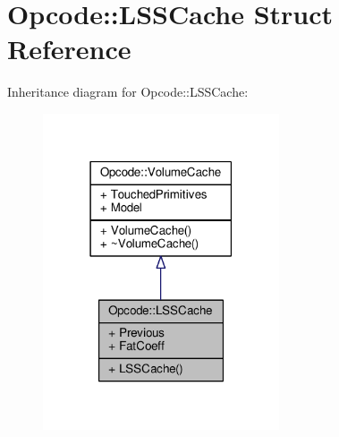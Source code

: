 \hypertarget{structOpcode_1_1LSSCache}{}\section{Opcode\+:\+:L\+S\+S\+Cache Struct Reference}
\label{structOpcode_1_1LSSCache}


Inheritance diagram for Opcode\+:\+:L\+S\+S\+Cache\+:
\nopagebreak
\begin{figure}[H]
\begin{center}
\leavevmode
\includegraphics[width=198pt]{df/d26/structOpcode_1_1LSSCache__inherit__graph}
\end{center}
\end{figure}


